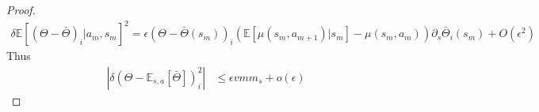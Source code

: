\documentclass[10.5pt]{article}
\newcommand\bb{\mathbb}
\newtheorem{lemma}{Lemma}
\begin{document}
\begin{proof}
  \begin{align*}
    \delta \bb E[ (\Theta - \bar \Theta)_i |a_m,s_m]^2 = \epsilon(\Theta - \bar \Theta(s_m))_i (\bb E[\mu(s_m,a_{m+1})|s_m]-\mu(s_m,a_m))\partial_s \bar \Theta_i(s_m) + O(\epsilon^2)
  \end{align*}
  Thus
  \begin{align*}
    |\delta (\Theta - \bb E_{s,a}[\bar \Theta])_i^2| &\leq \epsilon v m m_s + o(\epsilon)
  \end{align*}
\end{proof}

\end{document}
